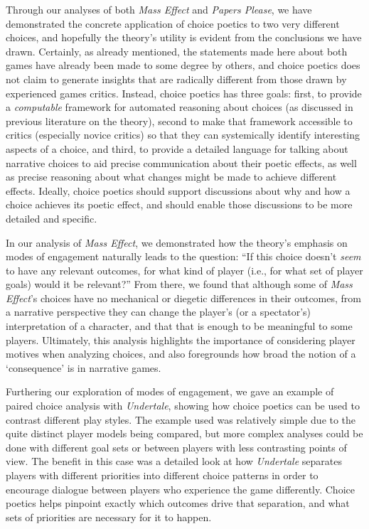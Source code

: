 \documentclass[arts,article,submit,moreauthors,pdftex,10pt,a4paper]{Definitions/mdpi}
\begin{document}
Through our analyses of both \emph{Mass Effect} and \emph{Papers Please}, we have demonstrated the concrete application of choice poetics to two very different choices, and hopefully the theory's utility is evident from the conclusions we have drawn.
%
Certainly, as already mentioned, the statements made here about both games have already been made to some degree by others, and choice poetics does not claim to generate insights that are radically different from those drawn by experienced games critics.
%
Instead, choice poetics has three goals: first, to provide a \emph{computable} framework for automated reasoning about choices (as discussed in previous literature on the theory), second to make that framework accessible to critics (especially novice critics) so that they can systemically identify interesting aspects of a choice, and third, to provide a detailed language for talking about narrative choices to aid precise communication about their poetic effects, as well as precise reasoning about what changes might be made to achieve different effects.
%
Ideally, choice poetics should support discussions about why and how a choice achieves its poetic effect, and should enable those discussions to be more detailed and specific.


In our analysis of \emph{Mass Effect}, we demonstrated how the theory's emphasis on modes of engagement naturally leads to the question: ``If this choice doesn't \emph{seem} to have any relevant outcomes, for what kind of player (i.e., for what set of player goals) would it be relevant?''
%
From there, we found that although some of \emph{Mass Effect}'s choices have no mechanical or diegetic differences in their outcomes, from a narrative perspective they can change the player's (or a spectator's) interpretation of a character, and that that is enough to be meaningful to some players.
%
Ultimately, this analysis highlights the importance of considering player motives when analyzing choices, and also foregrounds how broad the notion of a `consequence' is in narrative games.


Furthering our exploration of modes of engagement, we gave an example of paired choice analysis with \emph{Undertale}, showing how choice poetics can be used to contrast different play styles.
%
The example used was relatively simple due to the quite distinct player models being compared, but more complex analyses could be done with different goal sets or between players with less contrasting points of view.
%
The benefit in this case was a detailed look at how \emph{Undertale} separates players with different priorities into different choice patterns in order to encourage dialogue between players who experience the game differently.
%
Choice poetics helps pinpoint exactly which outcomes drive that separation, and what sets of priorities are necessary for it to happen.
\end{document}
